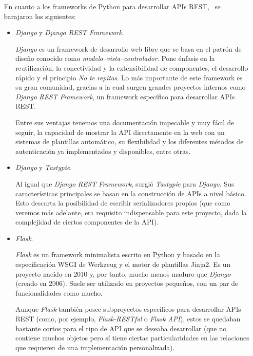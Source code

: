 En cuanto a los frameworks de Python para desarrollar APIs REST,~\cite{api-python}
se barajaron los siguientes:
\begin{itemize}
\item \textit{Django} y \textit{Django REST Framework}.

\textit{Django} es un framework de desarrollo web libre que se basa en el patrón
de diseño conocido como \textit{modelo–vista–controlador}. Pone énfasis en la
reutilización, la conectividad y la extensibilidad de componentes, el desarrollo
rápido y el principio \textit{No te repitas}. Lo más importante de este framework
es su gran comunidad, gracias a la cual surgen grandes proyectos internos como
\textit{Django REST Framework}, un framework específico para desarrollar APIs REST.

Entre sus ventajas tenemos una documentación impecable y muy fácil de seguir, la
capacidad de mostrar la API directamente en la web con un sistemas de plantillas
automático, su flexibilidad y los diferentes métodos de autenticación ya
implementados y disponibles, entre otras.

\item \textit{Django} y \textit{Tastypie}.

Al igual que \textit{Django REST Framework}, surgió \textit{Tastypie} para
\textit{Django}. Sus características principales se basan en la construcción de
APIs a nivel básico. Esto descarta la posibilidad de escribir serializadores
propios (que como veremos más adelante, era requisito indispensable para este
proyecto, dada la complejidad de ciertos componentes de la API).

\item \textit{Flask}.

\textit{Flask} es un framework minimalista escrito en Python y basado en la
especificación WSGI de Werkzeug y el motor de plantillas Jinja2. Es un proyecto
nacido en 2010 y, por tanto, mucho menos maduro que \textit{Django} (creado en
2006). Suele ser utilizado en proyectos pequeños, con un par de funcionalidades
como mucho.

Aunque \textit{Flask} también posee subproyectos específicos para desarrollar
APIs REST (como, por ejemplo, \textit{Flask-RESTful} o \textit{Flask API}),
estos se quedaban bastante cortos para el tipo de API que se deseaba desarrollar
(que no contiene muchos objetos pero sí tiene ciertas particularidades en las
relaciones que requieren de una implementación personalizada).
\end{itemize}

